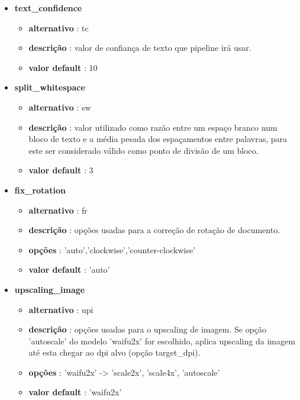 \begin{itemize}
	\item \textbf{text\_confidence}
		\begin{itemize}\setlength\itemsep{-0.5em}
			\vspace{-1em}
			\item \textbf{alternativo} : tc
			\item \textbf{descrição} : valor de confiança de texto que pipeline irá usar.
			\item \textbf{valor default} : 10
		\end{itemize}
	
	
	\item \textbf{split\_whitespace}
		\begin{itemize}\setlength\itemsep{-0.5em}
			\vspace{-1em}
			\item \textbf{alternativo} : sw
			\item \textbf{descrição} : valor utilizado como razão entre um espaço branco num bloco de texto e a média pesada dos espaçamentos entre palavras, para este ser considerado válido como ponto de divisão de um bloco.
			\item \textbf{valor default} : 3
		\end{itemize}
	
	\item \textbf{fix\_rotation}
		\begin{itemize}\setlength\itemsep{-0.5em}
			\vspace{-1em}
			\item \textbf{alternativo} : fr
			\item \textbf{descrição} : opções usadas para a correção de rotação de documento.
			\item \textbf{opções} : 'auto','clockwise','counter-clockwise'
			\item \textbf{valor default} : 'auto'
		\end{itemize}
	
	\item \textbf{upscaling\_image}
		\begin{itemize}\setlength\itemsep{-0.5em}
			\vspace{-1em}
			\item \textbf{alternativo} : upi
			\item \textbf{descrição} : opções usadas para o upscaling de imagem. Se opção 'autoscale' do modelo 'waifu2x' for escolhido, aplica upscaling da imagem até esta chegar ao dpi alvo (opção target\_dpi).
			\item \textbf{opções} : 'waifu2x' -> 'scale2x', 'scale4x', 'autoscale'
			\item \textbf{valor default} : 'waifu2x'
		\end{itemize}
	

\end{itemize}
